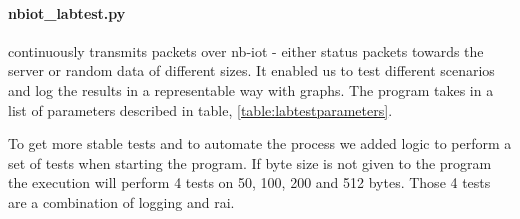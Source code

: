 \documentclass[USenglish]{ifimaster}  %
\begin{document}
\paragraph{\textbf{nbiot\_labtest.py}} continuously transmits packets over \acrshort{nb-iot} - either status packets towards the server or random data of different sizes. It enabled us to test different scenarios and log the results in a representable way with graphs. The program takes in a list of parameters described in table, \vref{table:labtestparameters}.

\begin{table}[H]
\centering
{}
\caption{\textbf{nbiot\_labtest.py} parameters. See \href{https://github.com/henninghaakonsen/thesis/blob/master/code/nbiot_labtest.py}{\acrshort{nb-iot} labtest}\cite{code:nbiotlabtest} for complete code}
\label{table:labtestparameters}
\end{table}

To get more stable tests and to automate the process we added logic to perform a set of tests when starting the program. If byte size is not given to the program the execution will perform 4 tests on 50, 100, 200 and 512 bytes. Those 4 tests are a combination of logging and \acrshort{rai}.
\end{document}
